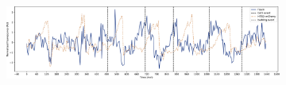 \begin{figure}[p]
  \centering
  \begin{subfigure}[htpb]{1.0\textwidth}
   \centering
   \includegraphics[width=\textwidth]{pyruvate_single_birth_plot_edit.pdf}
   \caption{
   }
   \label{fig:biology-pyruvate-single}


\end{subfigure}
\end{figure}
